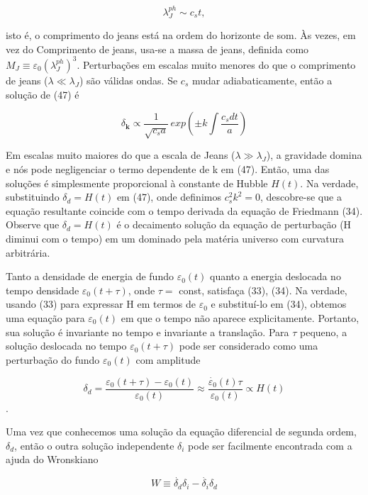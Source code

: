 \documentclass[a4paper,12pt]{article}
\begin{document}
\begin{equation}
	\lambda_J^{ph} \sim c_s t,
\end{equation}

isto é, o comprimento do jeans está na ordem do horizonte de som. Às vezes, em vez do
Comprimento de jeans, usa-se a massa de jeans, definida como $M_J \equiv\varepsilon_0 (\lambda_J^{ph})^3$.
Perturbações em escalas muito menores do que o comprimento de jeans ($\lambda \ll\lambda_J$) são válidas ondas. Se $c_s$ mudar adiabaticamente, então a solução de (47) é

\begin{equation}
	\delta_\mathbf{k} \propto \dfrac{1}{\sqrt{c_s a}} \,exp\left( \pm k \int \dfrac{c_s dt}{a}\right)
\end{equation}

Em escalas muito maiores do que a escala de Jeans ($\lambda \gg \lambda_J$), a gravidade domina e nós
pode negligenciar o termo dependente de k em (47). Então, uma das soluções é simplesmente
proporcional à constante de Hubble $H (t)$. Na verdade, substituindo $\delta_d = H (t)$ em (47),
onde definimos $c^2_s k^2 = 0$, descobre-se que a equação resultante coincide com o tempo
derivada da equação de Friedmann (34). Observe que $\delta_d = H (t)$ é o decaimento
solução da equação de perturbação (H diminui com o tempo) em um dominado pela matéria
universo com curvatura arbitrária.

Tanto a densidade de energia de fundo $\varepsilon_0 (t)$ quanto a energia deslocada no tempo
densidade $\varepsilon_0 (t + \tau)$, onde $\tau =$ const, satisfaça (33), (34). Na verdade, usando (33)
para expressar H em termos de $\varepsilon_0$ e substituí-lo em (34), obtemos uma equação para $\varepsilon_0 (t)$ em que o tempo não aparece explicitamente. Portanto, sua solução é invariante no tempo e invariante a translação. Para $\tau$ pequeno, a solução deslocada no tempo $\varepsilon_0 (t+ \tau)$ pode ser
considerado como uma perturbação do fundo $\varepsilon_0 (t)$ com amplitude

$$\delta_d = \dfrac{\varepsilon_0 (t+ \tau) -\varepsilon_0 (t) }{\varepsilon_0 (t)} \approx \dfrac{\dot{\varepsilon_0} (t)\tau }{\varepsilon_0 (t)} \propto H(t)$$.

Uma vez que conhecemos uma solução da equação diferencial de segunda ordem, $\delta_d$, então o
outra solução independente $\delta_i$ pode ser facilmente encontrada com a ajuda do Wronskiano

\begin{equation}
	W \equiv \dot{\delta_d} \delta_i - \dot{\delta_i} \delta_d
\end{equation}
\end{document}
